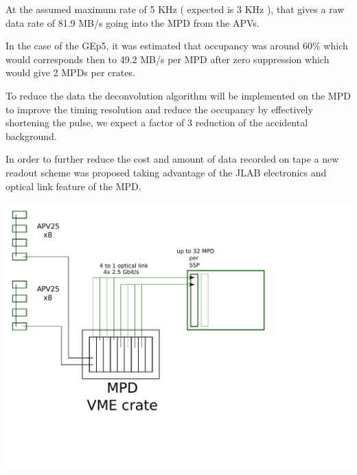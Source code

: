 \documentclass{article}
\begin{document}
At the assumed maximum rate of 5 KHz ( expected is 3 KHz ), that gives a raw data rate of 81.9 MB/s going into the MPD from the APVs.


In the case of the GEp5, it was estimated that occupancy was around 60\% which would corresponds then to 49.2 MB/s per MPD after zero suppression which would give 2 MPDs per crates. 

To reduce the data the deconvolution algorithm will be implemented on the MPD to improve the timing resolution and reduce the occupancy by effectively shortening the pulse, we expect a factor of 3 reduction of the accidental background.

In order to further reduce the cost and amount of data recorded on tape a new readout scheme was proposed taking advantage of the JLAB electronics and optical link feature of the MPD.

\includegraphics[scale=0.55]{figs/NewMPD.pdf}\\
\end{document}

